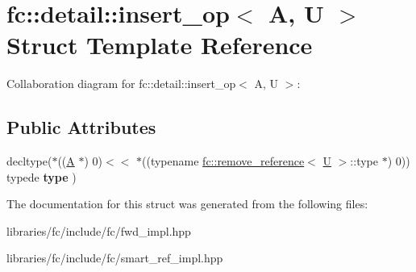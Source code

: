 \hypertarget{structfc_1_1detail_1_1insert__op}{}\section{fc\+:\+:detail\+:\+:insert\+\_\+op$<$ A, U $>$ Struct Template Reference}
\label{structfc_1_1detail_1_1insert__op}


Collaboration diagram for fc\+:\+:detail\+:\+:insert\+\_\+op$<$ A, U $>$\+:
\subsection*{Public Attributes}
\begin{DoxyCompactItemize}
\item 
\mbox{\label{structfc_1_1detail_1_1insert__op_afed9dcf2744d375cacd1e7cc25b5085b}} 
decltype($\ast$((\mbox{\hyperlink{struct_a}{A}} $\ast$) 0)$<$$<$ $\ast$((typename \mbox{\hyperlink{structfc_1_1remove__reference}{fc\+::remove\+\_\+reference}}$<$ \mbox{\hyperlink{union_u}{U}} $>$\+::type $\ast$) 0)) typede {\bfseries type} )
\end{DoxyCompactItemize}


The documentation for this struct was generated from the following files\+:\begin{DoxyCompactItemize}
\item 
libraries/fc/include/fc/fwd\+\_\+impl.\+hpp\item 
libraries/fc/include/fc/smart\+\_\+ref\+\_\+impl.\+hpp\end{DoxyCompactItemize}

